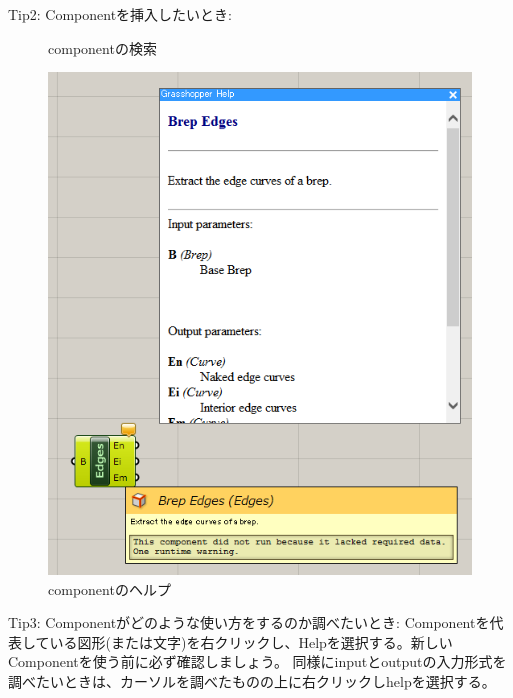 \documentclass[11pt]{jarticle}
\begin{document}
\begin{itembox}[l]{Tip2: Componentを挿入したいとき:}
\begin{figure}[H]
\begin{minipage}{0.5\hsize}
\caption{componentの検索}
\end{minipage}
\begin{minipage}{0.5\hsize}
\centering
\includegraphics[width=\linewidth]{fig/brepedge_help.png}
\caption{componentのヘルプ}
\end{minipage}
\end{figure}
\end{itembox}

\begin{itembox}[l]{Tip3: Componentがどのような使い方をするのか調べたいとき:}
  Componentを代表している図形(または文字)を右クリックし、Helpを選択する。新しいComponentを使う前に必ず確認しましょう。
  同様にinputとoutputの入力形式を調べたいときは、カーソルを調べたものの上に右クリックしhelpを選択する。
\end{itembox}
\end{document}
